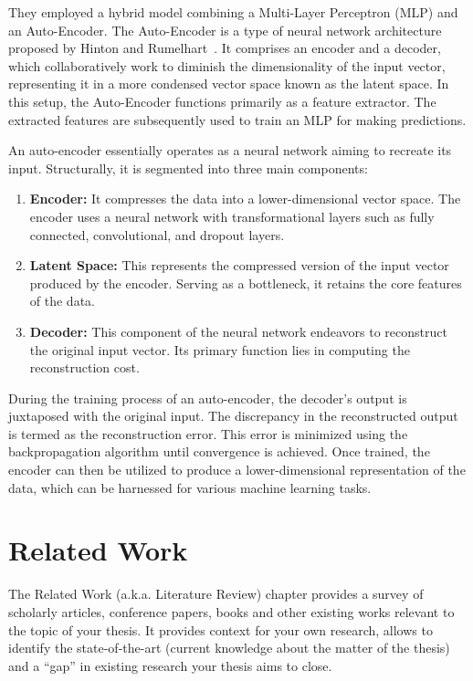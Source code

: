 \documentclass[a4paper,12pt]{Classes/RoboticsLaTeX}
\begin{document}
	They employed a hybrid model combining a Multi-Layer Perceptron (MLP) and an Auto-Encoder. The Auto-Encoder is a type of neural network architecture proposed by 
	Hinton and Rumelhart~\cite{rumelhart1986}. It comprises an encoder and a decoder, which collaboratively work to diminish the dimensionality of the input vector, 
	representing it in a more condensed vector space known as the latent space. In this setup, the Auto-Encoder functions primarily as a feature extractor. 
	The extracted features are subsequently used to train an MLP for making predictions.

	An auto-encoder essentially operates as a neural network aiming to recreate its input. Structurally, it is segmented into three main components:

	\begin{enumerate}
		\item \textbf{Encoder:} It compresses the data into a lower-dimensional vector space. The encoder uses a neural network with transformational layers such as fully connected, convolutional, and dropout layers.
		
		\item \textbf{Latent Space:} This represents the compressed version of the input vector produced by the encoder. Serving as a bottleneck, it retains the core features of the data.
		
		\item \textbf{Decoder:} This component of the neural network endeavors to reconstruct the original input vector. Its primary function lies in computing the reconstruction cost.
	\end{enumerate}

	During the training process of an auto-encoder, the decoder's output is juxtaposed with the original input. The discrepancy in the reconstructed output is termed as the reconstruction error. 
	This error is minimized using the backpropagation algorithm until convergence is achieved. Once trained, the encoder can then be utilized to produce a lower-dimensional 
	representation of the data, which can be harnessed for various machine learning tasks.

	\chapter{Related Work}
	\label{chap:rel_work}
	
	The Related Work (a.k.a. Literature Review) chapter provides a survey of scholarly articles, conference papers, books and other existing works relevant to the topic of your thesis. It provides context for your own research, allows to identify the state-of-the-art (current knowledge about the matter of the thesis) and a ``gap'' in existing research your thesis aims to close.\\
	
\end{document}
